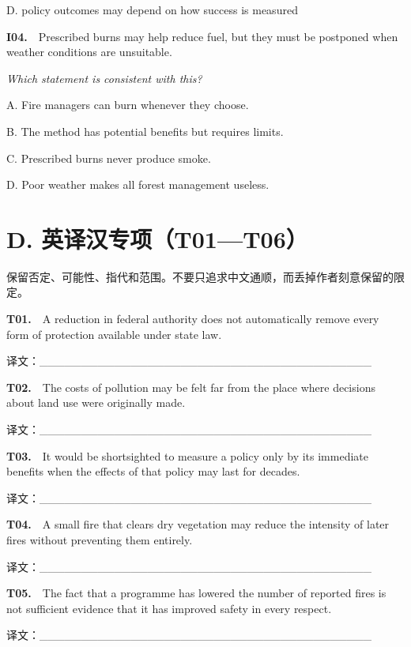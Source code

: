 \documentclass[a4paper,11pt,openany]{report}
\begin{document}
D. policy outcomes may depend on how success is measured

\textbf{I04.}　Prescribed burns may help reduce fuel, but they must be postponed when weather conditions are unsuitable.

\emph{Which statement is consistent with this?}

A. Fire managers can burn whenever they choose.

B. The method has potential benefits but requires limits.

C. Prescribed burns never produce smoke.

D. Poor weather makes all forest management useless.

\section{D. 英译汉专项（T01---T06）}\label{d.-ux82f1ux8bd1ux6c49ux4e13ux9879t01t06}

保留否定、可能性、指代和范围。不要只追求中文通顺，而丢掉作者刻意保留的限定。

\textbf{T01.}　A reduction in federal authority does not automatically remove every form of protection available under state law.

译文：\_\_\_\_\_\_\_\_\_\_\_\_\_\_\_\_\_\_\_\_\_\_\_\_\_\_\_\_\_\_\_\_\_\_\_\_\_\_\_\_

\textbf{T02.}　The costs of pollution may be felt far from the place where decisions about land use were originally made.

译文：\_\_\_\_\_\_\_\_\_\_\_\_\_\_\_\_\_\_\_\_\_\_\_\_\_\_\_\_\_\_\_\_\_\_\_\_\_\_\_\_

\textbf{T03.}　It would be shortsighted to measure a policy only by its immediate benefits when the effects of that policy may last for decades.

译文：\_\_\_\_\_\_\_\_\_\_\_\_\_\_\_\_\_\_\_\_\_\_\_\_\_\_\_\_\_\_\_\_\_\_\_\_\_\_\_\_

\textbf{T04.}　A small fire that clears dry vegetation may reduce the intensity of later fires without preventing them entirely.

译文：\_\_\_\_\_\_\_\_\_\_\_\_\_\_\_\_\_\_\_\_\_\_\_\_\_\_\_\_\_\_\_\_\_\_\_\_\_\_\_\_

\textbf{T05.}　The fact that a programme has lowered the number of reported fires is not sufficient evidence that it has improved safety in every respect.

译文：\_\_\_\_\_\_\_\_\_\_\_\_\_\_\_\_\_\_\_\_\_\_\_\_\_\_\_\_\_\_\_\_\_\_\_\_\_\_\_\_
\end{document}
